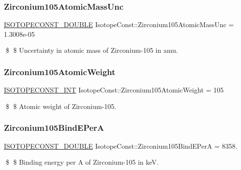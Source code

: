 \subsubsection{\texorpdfstring{Zirconium105\+Atomic\+Mass\+Unc}{Zirconium105AtomicMassUnc}}
{\footnotesize\ttfamily \mbox{\hyperlink{group___isotope_const-_macros_ga8f45a7272ce02c0b4c65c44636ed719a}{I\+S\+O\+T\+O\+P\+E\+C\+O\+N\+S\+T\+\_\+\+D\+O\+U\+B\+LE}} Isotope\+Const\+::\+Zirconium105\+Atomic\+Mass\+Unc = 1.\+3008e-\/05}

\$ \$ Uncertainty in atomic mass of Zirconium-\/105 in amu. \mbox{\label{group___isotope_const-_zirconium-_zr105_ga1f24e4f7b8fd7e7d8bcc2fd84015fb89}} 
\subsubsection{\texorpdfstring{Zirconium105\+Atomic\+Weight}{Zirconium105AtomicWeight}}
{\footnotesize\ttfamily \mbox{\hyperlink{group___isotope_const-_macros_ga5f18360b3e99483a35c32d789e62621c}{I\+S\+O\+T\+O\+P\+E\+C\+O\+N\+S\+T\+\_\+\+I\+NT}} Isotope\+Const\+::\+Zirconium105\+Atomic\+Weight = 105}

\$ \$ Atomic weight of Zirconium-\/105. \mbox{\label{group___isotope_const-_zirconium-_zr105_gaf633b392502671f380281aa2db7d8e07}} 
\subsubsection{\texorpdfstring{Zirconium105\+Bind\+E\+PerA}{Zirconium105BindEPerA}}
{\footnotesize\ttfamily \mbox{\hyperlink{group___isotope_const-_macros_ga8f45a7272ce02c0b4c65c44636ed719a}{I\+S\+O\+T\+O\+P\+E\+C\+O\+N\+S\+T\+\_\+\+D\+O\+U\+B\+LE}} Isotope\+Const\+::\+Zirconium105\+Bind\+E\+PerA = 8358.}

\$ \$ Binding energy per A of Zirconium-\/105 in keV. \mbox{\label{group___isotope_const-_zirconium-_zr105_ga9820e094aea7502ef609ee1c26fab1b1}} 
